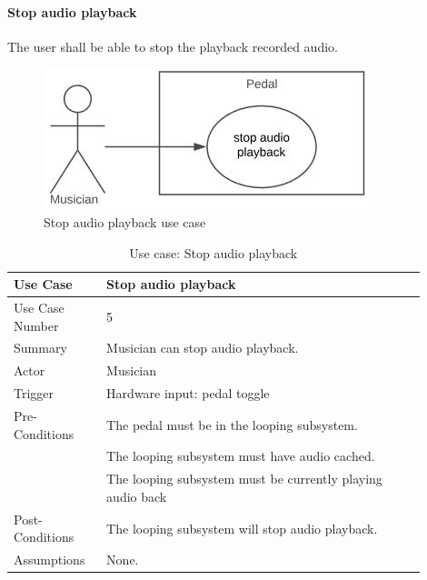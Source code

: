             \paragraph{Stop audio playback} 
            The user shall be able to stop the playback recorded audio.
            \begin{figure}[!ht]
                \centering
                \includegraphics[width=.5\textwidth]{diagrams/use_cases/uc-play-stop.JPG}
                \caption{Stop audio playback use case}
                \label{fig:uc-play-stop}
            \end{figure}
            \begin{table}[!ht]
                \centering
                \begin{tabular}{| p{0.2\linewidth} | p{0.7\linewidth} |}
                    \hline
                    Use Case & Stop audio playback \\ 
                    \hline \hline
                    Use Case Number & 5 \\ \hline
                    Summary & Musician can stop audio playback. \\ \hline
                    Actor & Musician \\ \hline
                    Trigger & Hardware input: pedal toggle \\ \hline
                    Pre-Conditions & The pedal must be in the looping subsystem. \\
                    & The looping subsystem must have audio cached. \\
                    & The looping subsystem must be currently playing audio back \\ \hline
                    Post-Conditions & The looping subsystem will stop audio playback. \\ \hline
                    Assumptions & None.\\ \hline
                \end{tabular}
                \\
                \label{tab:uc-play-stop}
                \caption{Use case: Stop audio playback}
            \end{table}
            
